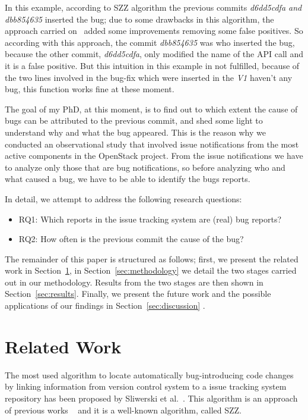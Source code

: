 \documentclass[ifip]{svmult}
\begin{document}
In this example, according to SZZ algorithm the previous commits \textit{d6dd5cdfa and dbb854635} inserted the bug; due to some drawbacks in this algorithm, the approach carried on~\cite{kim2006automatic} added some improvements removing some false positives. So according with this approach, the commit \textit{dbb854635} was who inserted the bug, because the other commit, \textit{d6dd5cdfa}, only modified the name of the API call and it is a false positive. But this intuition in this example in not fulfilled, because of the two lines involved in the bug-fix which were inserted in the \textit{V1} haven't any bug, this function works fine at these moment. 

The goal of my PhD, at this moment, is to find out to which extent the cause of bugs can be attributed to the previous commit, and shed some light to understand why and what the bug appeared. This is the reason why we conducted an observational study that involved issue notifications from the most active components in the OpenStack project. From the issue notifications we have to analyze only those that are bug notifications, so before analyzing who and what caused a bug, we have to be able to identify the bugs reports. 

In detail, we attempt to address the following research questions:
\begin{itemize}
    \item RQ1:  Which reports in the issue tracking system are (real) bug reports?
    \item RQ2:  How often is the previous commit the cause of the bug?
\end{itemize}

The remainder of this paper is structured as follows; first, we present the related work in Section~\ref{sec:related}, in Section~\ref{sec:methodology} we detail the two stages carried out in our methodology. Results from the two stages are then shown in Section~\ref{sec:results}. Finally, we present the future work and the possible applications of our findings in Section~\ref{sec:discussion} .

\section{Related Work}
\label{sec:related}

The most used algorithm to locate automatically bug-introducing code changes by linking information from version control system to a issue tracking system repository has been proposed by Sliwerski et al.~\cite{sliwerski2005changes}. This algorithm is an approach of previous works ~\cite{vcubranic2003hipikat,fischer2003analyzing,fischer2003populating} and it is a well-known algorithm, called SZZ.
\end{document}
